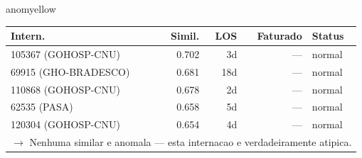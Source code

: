 \documentclass[a4paper,10pt]{article}
\begin{document}
\begin{anomalycard}[Internacao 119256 | GHO-BRADESCO | MODERADO (z=2.22)]{anomyellow}
\begin{tabular}{l r r r l}\toprule\textbf{Intern.} & \textbf{Simil.} & \textbf{LOS} & \textbf{Faturado} & \textbf{Status} \\\midrule
105367 (GOHOSP-CNU) & 0.702 & 3d & --- & \textcolor{jcubeblue}{normal} \\
69915 (GHO-BRADESCO) & 0.681 & 18d & --- & \textcolor{jcubeblue}{normal} \\
110868 (GOHOSP-CNU) & 0.678 & 2d & --- & \textcolor{jcubeblue}{normal} \\
62535 (PASA) & 0.658 & 5d & --- & \textcolor{jcubeblue}{normal} \\
120304 (GOHOSP-CNU) & 0.654 & 4d & --- & \textcolor{jcubeblue}{normal} \\
\multicolumn{5}{l}{\textcolor{jcubeblue}{\small $\rightarrow$ Nenhuma similar e anomala --- esta internacao e verdadeiramente atipica.}} \\
\bottomrule\end{tabular}


\end{anomalycard}

\newpage
\end{document}
